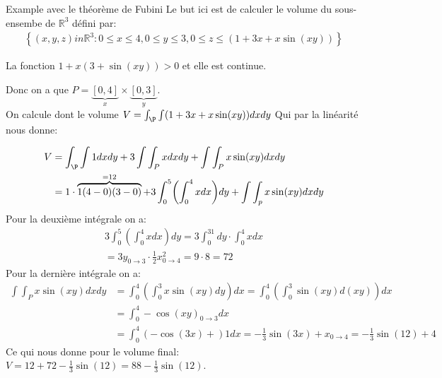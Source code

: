 \begin{parag}{Example avec le théorème de Fubini}
    Le but ici est de calculer le volume du sous-ensembe de  $\mathbb{R}^{3}$ défini par:
    \begin{align*} \left\{\left(x, y, z\right) in \mathbb{R}^{3}: 0 \leq x \leq 4, 0 \leq y \leq 3, 0 \leq z \leq \left( 1 + 3x + x\sin\left(xy\right)\right)\right\} \end{align*}
    \begin{framedremark}
        La fonction $1 + x\left(3 + \sin\left(xy\right)\right) > 0$ et elle est continue.
    \end{framedremark}
    Donc on a que $P =  \underbrace{\left[0, 4\right]}_{x} \times \underbrace{\left[0, 3\right]}_{y}$.\\
    On calcule dont le volume $V =  \int_\P\int \left(1 + 3x + x\sin\left(xy\right)\right)dxdy$ Qui par la linéarité nous donne:

    \begin{align*}  
        V &= \int_\P\int 1dxdy + 3\int\int_Pxdxdy + \int\int_Px\sin\left(xy\right)dxdy\\
          &= 1\cdot \overbrace{1\left(4-0\right)\left(3-0\right)}^{= 12} + 3 \int_0^5\left(\int_0^4 xdx\right)dy + \int\int_px\sin\left(xy\right)dxdy 
    \end{align*}
    Pour la deuxième intégrale on a:
    \begin{align*} 3\int_0^5\left(\int_0^4xdx\right)dy = 3\int_0^31dy\cdot \int_0^4xdx\\
    = 3y_{0 \to 3}\cdot \frac{1}{2}x^2_{0 \to 4} =  9 \cdot  8 =  72\end{align*}
    Pour la dernière intégrale on a:
    \begin{align*} \int\int_P x \sin\left(xy\right)dxdy &=  \int_0^4\left(\int_0^3x\sin\left(xy\right)dy\right)dx =  \int_0^4\left(\int_0^3 \sin\left(xy\right)d\left(xy\right)\right)dx\\
    &= \int_0^4 - \cos\left(xy\right)_{0 \to 3}dx\\
    &= \int_0^4 \left(-\cos\left(3x\right) +\right) 1 dx =  -\frac{1}{3}\sin\left(3x\right) + x_{0 \to 4} =  -\frac{1}{3}\sin\left(12\right) + 4
\end{align*}
Ce qui nous donne pour le volume final: $V =  12 + 72 - \frac{1}{3}\sin\left(12\right) =  88 - \frac{1}{3}\sin\left(12\right)$.
\end{parag}
